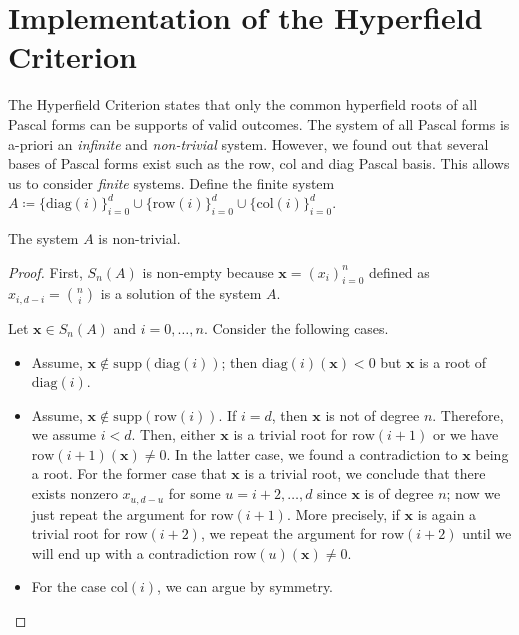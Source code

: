 \section{Implementation of the Hyperfield Criterion}

The Hyperfield Criterion states that only the common hyperfield roots of all Pascal forms can be supports of valid outcomes. The system of all Pascal forms is a-priori an \emph{infinite} and \emph{non-trivial} system. However, we found out that several bases of Pascal forms exist such as the row, col and diag Pascal basis. This allows us to consider \emph{finite} systems. Define the finite system \( A \coloneqq \{ \mathrm{diag}(i) \}_{i=0}^d \cup \{ \mathrm{row}(i)\}^d_{i=0} \cup \{ \mathrm{col}(i) \}^d_{i=0} \).

\begin{proposition}
The system $A$ is non-trivial.
\end{proposition}

\begin{proof}
First, $S_{n}(A)$ is non-empty because $\mathbf{x} = (x_{i})_{i=0}^n$ defined as $x_{i, d-i} = {n \choose i}$ is a solution of the system $A$. 

Let $\mathbf{x} \in S_{n}(A)$ and $i = 0, \dots, n$. Consider the following cases.
\begin{itemize}
    \item Assume, $\mathbf{x} \notin \mathrm{supp}(\mathrm{diag}(i))$; then $\mathrm{diag}(i)(\mathbf{x}) < 0$ but $\mathbf{x}$ is a root of \( \mathrm{diag}(i) \). 
    \item Assume, $\mathbf{x} \notin \mathrm{supp}(\mathrm{row}(i))$. If $i = d$, then $\mathbf{x}$ is not of degree $n$. Therefore, we assume $i < d$. Then, either $\mathbf{x}$ is a trivial root for $\mathrm{row}(i+1)$ or we have $\mathrm{row}(i+1)(\mathbf{x}) \neq 0$. In the latter case, we found a contradiction to $\mathbf{x}$ being a root. For the former case that $\mathbf{x}$ is a trivial root, we conclude that there exists nonzero $x_{u, d-u}$ for some $u = i+2, \dots, d$ since $\mathbf{x}$ is of degree $n$; now we just repeat the argument for $\mathrm{row}(i+1)$. More precisely, if $\mathbf{x}$ is again a trivial root for $\mathrm{row}(i+2)$, we repeat the argument for $\mathrm{row}(i+2)$ until we will end up with a contradiction $\mathrm{row}(u)(\mathbf{x}) \neq 0$.
    \item For the case $\mathrm{col}(i)$, we can argue by symmetry.
\end{itemize}
\end{proof}

